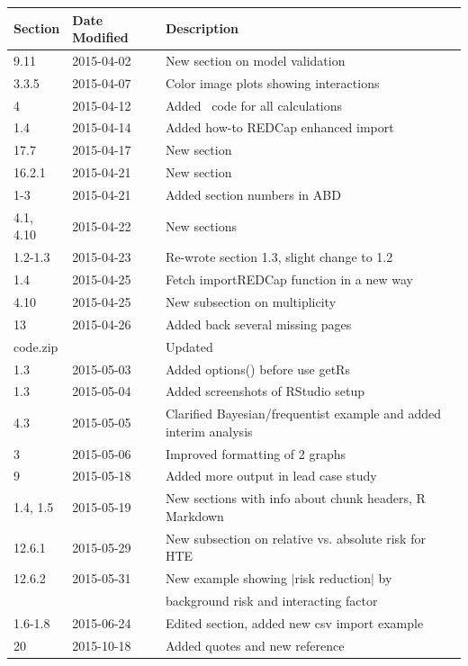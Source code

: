 \documentclass{report}
\begin{document}
\begin{center}\small
\begin{tabular}{lll}
Section & Date Modified & Description \\ \hline
9.11    & 2015-04-02 & New section on model validation \\
3.3.5   & 2015-04-07 & Color image plots showing interactions \\
4       & 2015-04-12 & Added \R\ code for all calculations \\
1.4     & 2015-04-14 & Added how-to REDCap enhanced import \\
17.7    & 2015-04-17 & New section \\
16.2.1  & 2015-04-21 & New section \\
1-3     & 2015-04-21 & Added section numbers in ABD \\
4.1, 4.10 & 2015-04-22 & New sections \\
1.2-1.3 & 2015-04-23 & Re-wrote section 1.3, slight change to 1.2\\
1.4     & 2015-04-25 & Fetch importREDCap function in a new way\\
4.10    & 2015-04-25 & New subsection on multiplicity\\
13      & 2015-04-26 & Added back several missing pages\\
code.zip&            & Updated\\
1.3     & 2015-05-03 & Added options() before use getRs\\
1.3     & 2015-05-04 & Added screenshots of RStudio setup\\
4.3     & 2015-05-05 & Clarified Bayesian/frequentist example and
                       added interim analysis\\
3       & 2015-05-06 & Improved formatting of 2 graphs\\
9       & 2015-05-18 & Added more output in lead case study\\
1.4, 1.5& 2015-05-19 & New sections with info about chunk headers, R
                       Markdown\\
12.6.1  & 2015-05-29 & New subsection on relative vs. absolute risk
                       for HTE\\
12.6.2  & 2015-05-31 & New example showing $|$risk reduction$|$ by\\
        &            & background risk and interacting factor\\
1.6-1.8 & 2015-06-24 & Edited section, added new csv import example\\
20      & 2015-10-18 & Added quotes and new reference\\

\end{tabular}
\end{center}
\end{document}
